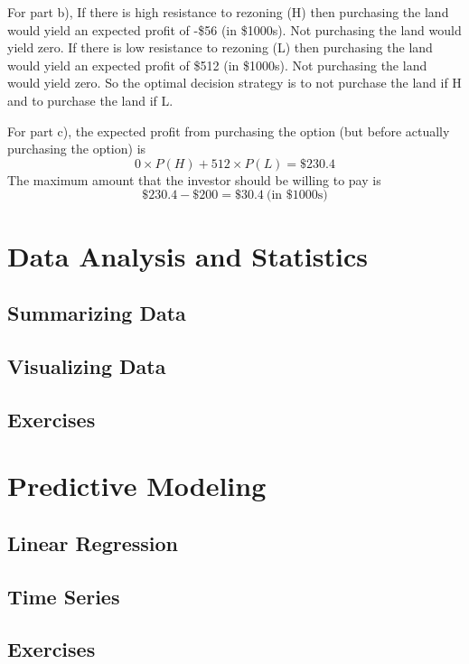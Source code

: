 \documentclass[12pt]{book}
\begin{document}
\begin{enumerate}
\begin{solution}
For part b), If there is high resistance to rezoning (H) then
purchasing the land would yield an expected profit of -\$56 (in \$1000s).
Not purchasing the land would yield zero. If there is low
resistance to rezoning (L) then purchasing the land would yield
an expected profit of \$512 (in \$1000s). Not purchasing the
land would yield zero. So the optimal decision strategy is to
not purchase the land if H and to purchase the land if L.

For part c), the expected profit from purchasing the option
(but before actually purchasing the option) is
\[ 0 \times P(H) + 512 \times P(L) = \$230.4 \]
The maximum amount that the investor should be willing to pay is
\[ \$230.4 - \$200 = \$30.4 ~\text{(in \$1000s)} \]
\end{solution}


\end{enumerate}

%
\chapter{Data Analysis and Statistics}

\section{Summarizing Data}

\section{Visualizing Data}

\section{Exercises}

%
\chapter{Predictive Modeling}

\section{Linear Regression}

\section{Time Series}

\section{Exercises}

%
\backmatter
%
\nocite{Anderson:2015pnas} %

\end{document}
